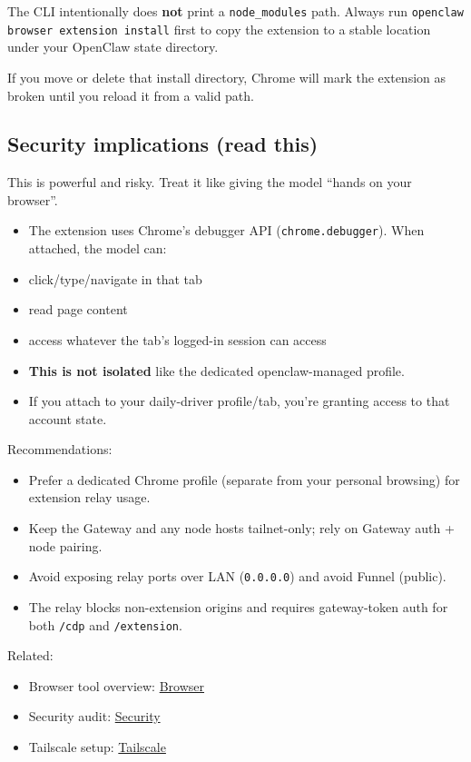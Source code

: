 The CLI intentionally does \textbf{not} print a \texttt{node\_modules} path. Always run \texttt{openclaw browser extension install} first to copy the extension to a stable location under your OpenClaw state directory.

If you move or delete that install directory, Chrome will mark the extension as broken until you reload it from a valid path.

\subsection{Security implications (read this)}


This is powerful and risky. Treat it like giving the model “hands on your browser”.

\begin{itemize}
  \item The extension uses Chrome’s debugger API (\texttt{chrome.debugger}). When attached, the model can:
  \item click/type/navigate in that tab
  \item read page content
  \item access whatever the tab’s logged-in session can access
  \item \textbf{This is not isolated} like the dedicated openclaw-managed profile.
  \item If you attach to your daily-driver profile/tab, you’re granting access to that account state.
\end{itemize}


Recommendations:

\begin{itemize}
  \item Prefer a dedicated Chrome profile (separate from your personal browsing) for extension relay usage.
  \item Keep the Gateway and any node hosts tailnet-only; rely on Gateway auth + node pairing.
  \item Avoid exposing relay ports over LAN (\texttt{0.0.0.0}) and avoid Funnel (public).
  \item The relay blocks non-extension origins and requires gateway-token auth for both \texttt{/cdp} and \texttt{/extension}.
\end{itemize}


Related:

\begin{itemize}
  \item Browser tool overview: \href{/tools/browser}{Browser}
  \item Security audit: \href{/gateway/security}{Security}
  \item Tailscale setup: \href{/gateway/tailscale}{Tailscale}
\end{itemize}




